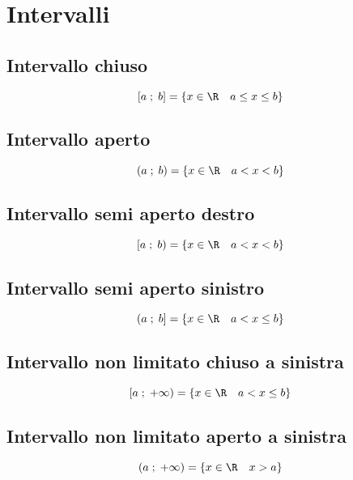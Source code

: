\chapter{Intervalli}
\section{Intervallo chiuso}
\begin{equation}
\left[a\; ;\; b\right]=\lbrace x\in\R\quad a\leq x\leq b\rbrace
\end{equation}
\section{Intervallo aperto}
\begin{equation}
\left(a\; ;\; b\right)=\lbrace x\in\R\quad a<x<b\rbrace
\end{equation}
\section{Intervallo semi aperto destro}
\begin{equation}
\left[a\; ;\; b\right)=\lbrace x\in\R\quad a<x<b\rbrace
\end{equation}
\section{Intervallo semi aperto sinistro}
\begin{equation}
\left(a\; ;\; b\right]=\lbrace x\in\R\quad a<x\leq b\rbrace
\end{equation}
\section{Intervallo non limitato chiuso a sinistra}
\begin{equation}
\left[a\; ;\; +\infty\right)=\lbrace x\in\R\quad a<x\leq b\rbrace
\end{equation}
\section{Intervallo non limitato aperto a sinistra}
\begin{equation}
\left(a\; ;\; +\infty\right)=\lbrace x\in\R\quad x> a\rbrace
\end{equation}
